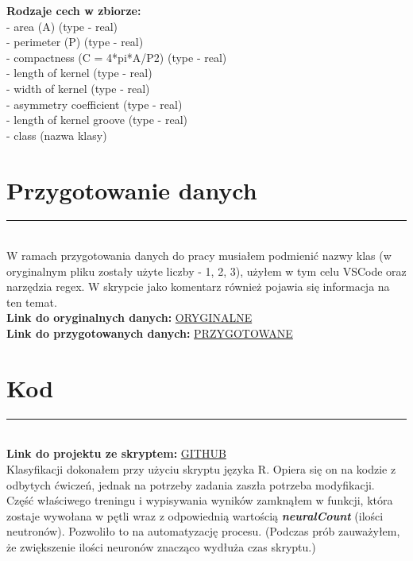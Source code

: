 \documentclass[a4paper,12pt]{article}
\newcommand{\linia}{\rule{\linewidth}{0.5pt}}
\theoremstyle{mytheor}
\begin{document}
\textbf{Rodzaje cech w zbiorze:}\\
 - area (A) (type - real)\\
 - perimeter (P) (type - real)\\
 - compactness (C = 4*pi*A/P2) (type - real)\\
 - length of kernel (type - real)\\
 - width of kernel (type - real)\\
 - asymmetry coefficient (type - real)\\
 - length of kernel groove (type - real)\\
 - class (nazwa klasy)\\

\section*{Przygotowanie danych}
\linia\\
 W ramach przygotowania danych do pracy musiałem podmienić nazwy klas (w oryginalnym pliku zostały użyte liczby - 1, 2, 3), użyłem w tym celu VSCode oraz narzędzia regex. W skrypcie jako komentarz również pojawia się informacja na ten temat.\\
 
 \textbf{Link do oryginalnych danych:} \textcolor{red}{\href{https://github.com/bvdzynski/up_ai-lab}{ORYGINALNE}}\\
 
 \textbf{Link do przygotowanych danych:} \textcolor{red}{\href{https://github.com/bvdzynski/up_ai-lab}{PRZYGOTOWANE}}\\
 
\section*{Kod}
\linia\\
\textbf{Link do projektu ze skryptem:} \textcolor{red}{\href{https://github.com/bvdzynski/up_ai-lab}{GITHUB}}\\

Klasyfikacji dokonałem przy użyciu skryptu języka R.
Opiera się on na kodzie z odbytych ćwiczeń, jednak na potrzeby zadania zaszła potrzeba modyfikacji.\\

Część właściwego treningu i wypisywania wyników zamknąłem w funkcji, która zostaje wywołana w pętli wraz z odpowiednią wartością \textbf{\emph{neuralCount}} (ilości neutronów). Pozwoliło to na automatyzację procesu. (Podczas prób zauważyłem, że zwiększenie ilości neuronów znacząco wydłuża czas skryptu.)\\
\end{document}
